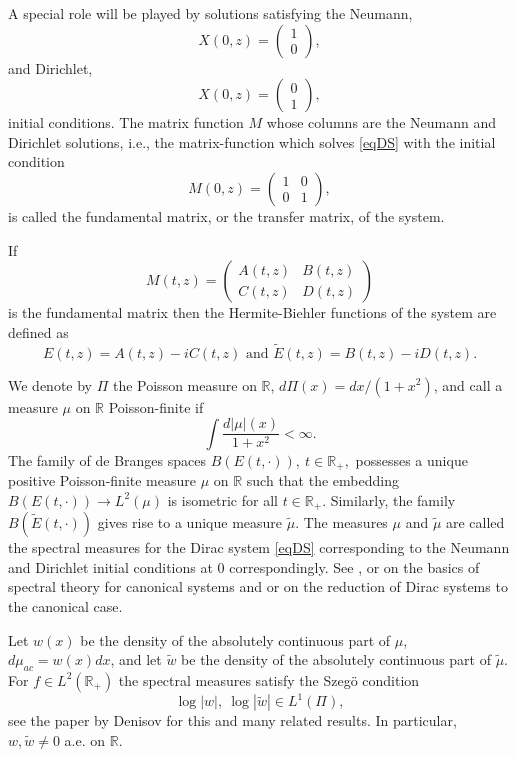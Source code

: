 \documentclass[11pt,twoside,reqno]{amsart}
\def\ti{\tilde}
\def\to{\rightarrow}
\def\R{{\mathbb R}}
\theoremstyle{plain}
\numberwithin{equation}{section}
\begin{document}
A special role will be played by solutions  satisfying the Neumann, $$X(0,z)=\begin{pmatrix} 1 \\ 0 \end{pmatrix},$$
and Dirichlet, $$X(0,z)=\begin{pmatrix} 0 \\ 1 \end{pmatrix},$$ initial conditions.
The matrix function $M$ whose columns are the Neumann and Dirichlet solutions, i.e., the matrix-function which solves
\eqref{eqDS} with the initial condition $$M(0,z)=\begin{pmatrix} 1 & 0 \\ 0 & 1 \end{pmatrix},$$ is called
the fundamental matrix, or the transfer matrix,  of the system.

If $$M(t,z)=\begin{pmatrix} A(t,z) & B(t,z) \\ C(t,z) & D(t,z) \end{pmatrix}$$ is the fundamental matrix then the Hermite-Biehler functions of the system are defined as
$$E(t,z)=A(t,z)-iC(t,z)\textrm{ and }\ti E(t,z)=B(t,z)-iD(t,z).$$

We denote by $\Pi$ the Poisson measure on $\R$, $d\Pi(x)=dx/(1+x^2)$, and call a measure $\mu$ on $\R$ Poisson-finite if
$$\int\frac{d|\mu|(x)}{1+x^2}<\infty.$$
The family of de Branges spaces $B(E(t,\cdot)),\ t\in\R_+,$ possesses a unique positive Poisson-finite measure $\mu$ on $\R$ such that the embedding $B(E(t,\cdot))\to L^2(\mu)$ is isometric for all $t\in\R_+$. Similarly, the family $B(\ti E(t,\cdot))$ gives rise to a unique measure $\ti\mu$. The measures $\mu$ and $\ti\mu$ are called the spectral measures for the Dirac system \eqref{eqDS} corresponding to the Neumann and Dirichlet initial conditions at $0$ correspondingly. See \cite{dBr}, \cite{R} or \cite{MIF1} on the basics of spectral theory for canonical systems and \cite{Den} or \cite{Ro} on the reduction of Dirac systems to the canonical case.

Let $w(x)$ be the density of the absolutely continuous part of $\mu$, $d\mu_{ac}=w(x)dx$, and let $\ti w$ be the density of the absolutely continuous part of $\ti\mu$. For $f\in L^2(\R_+)$ the spectral measures satisfy the Szeg\"o condition
$$\log |w|, \ \log |\ti w|\in L^1(\Pi),$$
see the paper by Denisov \cite{Den} for this and many related results. In particular, $w,\ti w \neq 0$ a.e. on $\R$.
\end{document}
